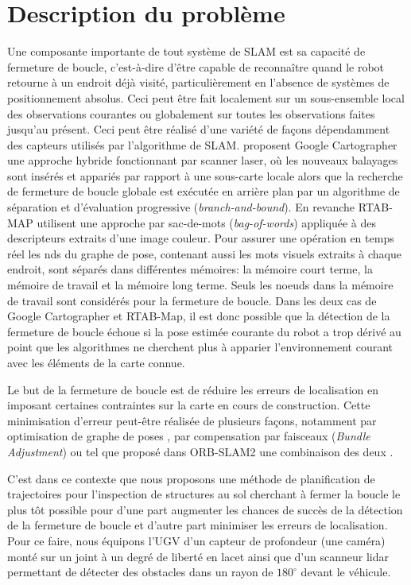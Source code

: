 \section{Description du problème} \label{sec:ugv_problem_description}
Une composante importante de tout système de SLAM est sa capacité de fermeture de boucle, c'est-à-dire d'être capable de reconnaître quand le robot retourne à un endroit déjà visité, particulièrement en l'absence de systèmes de positionnement absolus. Ceci peut être fait localement sur un sous-ensemble local des observations courantes ou globalement sur toutes les observations faites jusqu'au présent. Ceci peut être réalisé d'une variété de façons dépendamment des capteurs utilisés par l'algorithme de SLAM. \citep{Hess2016} proposent Google Cartographer une approche hybride fonctionnant par scanner laser, où les nouveaux balayages sont insérés et appariés par rapport à une sous-carte locale alors que la recherche de fermeture de boucle globale est exécutée en arrière plan par un algorithme de séparation et d'évaluation progressive (\textit{branch-and-bound}). En revanche RTAB-MAP \citep{Labbe2014} utilisent une approche par sac-de-mots (\textit{bag-of-words}) appliquée à des descripteurs extraits d'une image couleur. Pour assurer une opération en temps réel les n\oeu ds du graphe de pose, contenant aussi les mots visuels extraits à chaque endroit, sont séparés dans différentes mémoires: la mémoire court terme, la mémoire de travail et la mémoire long terme. Seuls les noeuds dans la mémoire de travail sont considérés pour la fermeture de boucle. Dans les deux cas de Google Cartographer et RTAB-Map, il est donc possible que la détection de la fermeture de boucle échoue si la pose estimée courante du robot a trop dérivé au point que les algorithmes ne cherchent plus à apparier l'environnement courant avec les éléments de la carte connue.

Le but de la fermeture de boucle est de réduire les erreurs de localisation en imposant certaines contraintes sur la carte en cours de construction. Cette minimisation d'erreur peut-être réalisée de plusieurs façons, notamment par optimisation de graphe de poses \citep{Carlone2016}, par compensation par faisceaux (\textit{Bundle Adjustment}) \citep{Mei2011} ou tel que proposé dans ORB-SLAM2 une combinaison des deux \citep{Mur-Artal2017}.

C'est dans ce contexte que nous proposons une méthode de planification de trajectoires pour l'inspection de structures au sol cherchant à fermer la boucle le plus tôt possible pour d'une part augmenter les chances de succès de la détection de la fermeture de boucle et d'autre part minimiser les erreurs de localisation. Pour ce faire, nous équipons l'UGV d'un capteur de profondeur (une caméra) monté sur un joint à un degré de liberté en lacet ainsi que d'un scanneur lidar permettant de détecter des obstacles dans un rayon de $180^\circ$ devant le véhicule.


